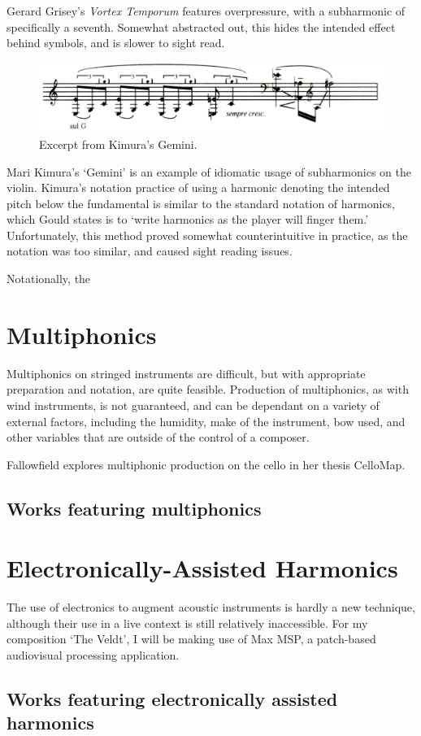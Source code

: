 Gerard Grisey's \emph{Vortex Temporum} features overpressure, with a subharmonic of specifically a seventh. Somewhat abstracted out, this hides the intended effect behind symbols, and is slower to sight read.

\begin{figure}
    \includegraphics[width=\linewidth]{./resources/kimura_gemini.png}
    \caption{Excerpt from Kimura's Gemini.}
    \label{fig:Excerpt from Kimura's Gemini}
  \end{figure}
  Mari Kimura's `Gemini' is an example of idiomatic usage of subharmonics on the violin. Kimura's notation practice of using a harmonic denoting the intended pitch below the fundamental is similar to the standard notation of harmonics, which Gould states is to `write harmonics as the player will finger them.'\autocite[413]{gouldBars2011} Unfortunately, this method proved somewhat counterintuitive in practice, as the notation was too similar, and caused sight reading issues.

Notationally, the 

\section{Multiphonics}
Multiphonics on stringed instruments are difficult, but with appropriate preparation and notation, are quite feasible. Production of multiphonics, as with wind instruments, is not guaranteed, and can be dependant on a variety of external factors, including the humidity, make of the instrument, bow used, and other variables that are outside of the control of a composer.

Fallowfield explores multiphonic production on the cello in her thesis CelloMap.\autocite{fallowfieldCelloMapHandbook2009} \lipsum[2]

\subsection{Works featuring multiphonics}
\lipsum[4]

\section{Electronically-Assisted Harmonics}
The use of electronics to augment acoustic instruments is hardly a new technique, although their use in a live context is still relatively inaccessible. For my composition `The Veldt', I will be making use of Max MSP, a patch-based audiovisual processing application. 

\subsection{Works featuring electronically assisted harmonics}
\lipsum[4]
